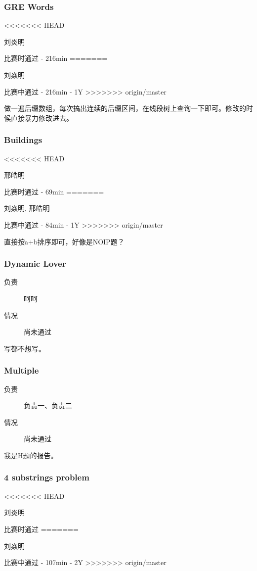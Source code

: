 \documentclass[a4paper, 11pt, nofonts, nocap, fancyhdr]{ctexart}
\newcommand{\problem}[1]{\subsubsection{#1}}
\begin{document}
\problem{GRE Words}

\begin{description}
<<<<<<< HEAD
\item[负责] 刘炎明
\item[情况] 比赛时通过 - 216min
=======
\item[负责] 刘焱明
\item[情况] 比赛中通过 - 216min - 1Y
>>>>>>> origin/master
\end{description}

做一遍后缀数组，每次搞出连续的后缀区间，在线段树上查询一下即可。修改的时候直接暴力修改进去。

\problem{Buildings}

\begin{description}
<<<<<<< HEAD
\item[负责] 邢皓明
\item[情况] 比赛时通过 - 69min
=======
\item[负责] 刘焱明, 邢皓明
\item[情况] 比赛中通过 - 84min - 1Y
>>>>>>> origin/master
\end{description}

直接按a+b排序即可，好像是NOIP题？

\problem{Dynamic Lover}

\begin{description}
\item[负责] 呵呵
\item[情况] 尚未通过
\end{description}

写都不想写。

\problem{Multiple}

\begin{description}
\item[负责] 负责一、负责二
\item[情况] 尚未通过
\end{description}

我是H题的报告。

\problem{4 substrings problem}

\begin{description}
<<<<<<< HEAD
\item[负责] 刘炎明
\item[情况] 比赛时通过
=======
\item[负责] 刘焱明
\item[情况] 比赛中通过 - 107min - 2Y
>>>>>>> origin/master
\end{description}
\end{document}
